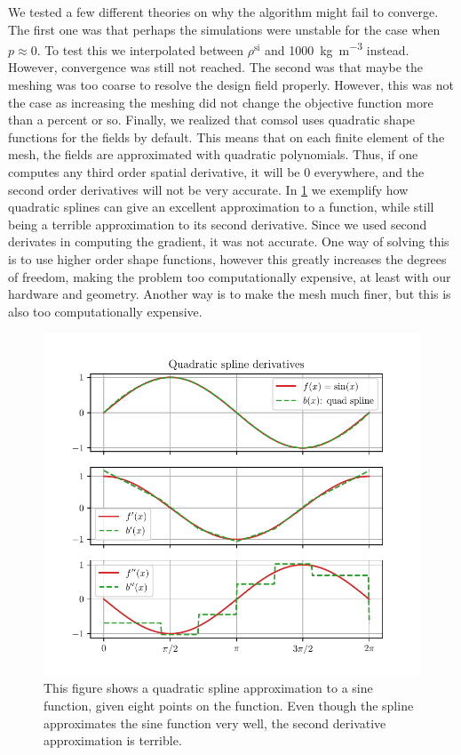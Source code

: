 We tested a few different theories on why the algorithm might fail to converge.
The first one was that perhaps the simulations were unstable for the case when
$p\approx 0$. To test this we interpolated between $\rho^\text{si}$ and
\qty{1000}{\kg\per\m^3} instead. However, convergence was still not reached.
The second was that maybe the meshing was too coarse to resolve the design
field properly. However, this was not the case as increasing the meshing did not
change the objective function more than a percent or so.
Finally, we realized that comsol uses quadratic shape functions
for the fields by default.
This means that on each finite element of the mesh, the fields
are approximated with quadratic polynomials. Thus, if one computes any third
order spatial derivative, it will be 0 everywhere, and the second order
derivatives will not be very accurate.
In \cref{fig:quad_spline_sine} we exemplify how quadratic splines can give an
excellent approximation to a function, while still being a terrible approximation to its
second derivative.
Since we used second derivates in computing the gradient,
it was not accurate.
One way of solving this is to use higher order shape functions, however this
greatly increases the degrees of freedom, making the problem too computationally
expensive, at least with our hardware and geometry.
Another way is to make the mesh much finer, but this is also too computationally
expensive.
\begin{figure}[htpb]
	\centering
	\includegraphics{chapters/results/quad_spline_sine.pdf}
	\caption{%
		This figure shows a quadratic spline approximation to a sine function,
		given eight points on the function. Even though the spline approximates
		the sine function very well, the second derivative approximation is
		terrible.
	}%
	\label{fig:quad_spline_sine}
\end{figure}

